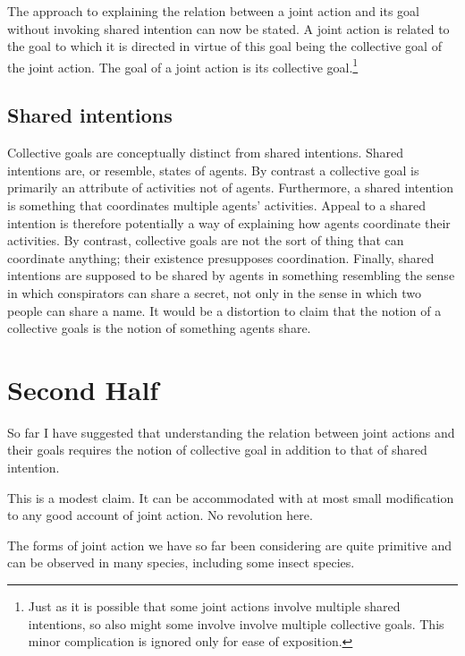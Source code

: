 \documentclass[12pt,a4paper]{extarticle}
\begin{document}
The approach to explaining the relation between a joint action and its goal without invoking shared intention can now be stated.  A joint action is related to the goal to which it is directed in virtue of this goal  being the collective goal of the joint action.  The goal of a joint action is its collective goal.\footnote{  
Just as it is possible that some joint actions involve multiple shared intentions, so also might some involve involve multiple collective goals.  This minor complication is ignored only for ease of exposition.
}


\subsection{Shared intentions}
Collective goals are conceptually distinct from shared intentions.  Shared intentions are, or resemble, states of agents.  By contrast a collective goal is primarily an attribute of activities not of agents.  Furthermore, a shared intention is something that coordinates multiple agents' activities.  Appeal to a shared intention is therefore potentially a way of explaining how agents coordinate their activities.  By contrast, collective goals are not the sort of thing that can coordinate anything; their existence presupposes coordination.  Finally, shared intentions are supposed to be shared by agents in something resembling the sense in which conspirators can share a secret, not only in the sense in which two people can share a name.  It would be a distortion to claim that the notion of a collective goals is the notion of something agents share.







\section{Second Half}

So far I have suggested that understanding the relation between joint actions and their goals requires the notion of collective goal in addition to that of shared intention.

This is a modest claim.  It can be accommodated with at most small modification to any good account of joint action.  No revolution here.

The forms of joint action we have so far been considering are quite primitive and can be observed in many species, including some insect species.
\end{document}
